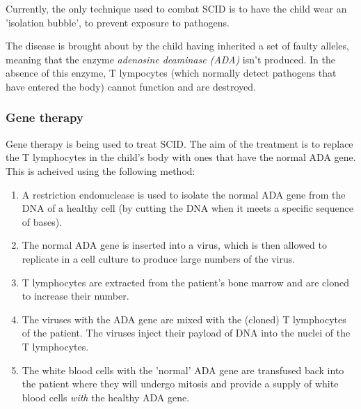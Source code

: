 \documentclass{article}
\begin{document}
Currently, the only technique used to combat SCID is to have the child wear an
'isolation bubble', to prevent exposure to pathogens.

The disease is brought about by the child having inherited a set of faulty
alleles, meaning that the enzyme {\it adenosine deaminase (ADA)} isn't produced.
In the absence of this enzyme, T lympocytes (which normally detect pathogens
that have entered the body) cannot function and are destroyed.

\subsubsection*{Gene therapy}

Gene therapy is being used to treat SCID. The aim of the treatment is to replace
the T lymphocytes in the child's body with ones that have the normal ADA gene.
This is acheived using the following method:

\begin{enumerate}

	\item A restriction endonuclease is used to isolate the normal ADA gene from
	the DNA of a healthy cell (by cutting the DNA when it meets a specific
	sequence of bases).

	\item The normal ADA gene is inserted into a virus, which is then allowed to
	replicate in a cell culture to produce large numbers of the virus.

	\item T lymphocytes are extracted from the patient's bone marrow and are
	cloned to increase their number.

	\item The viruses with the ADA gene are mixed with the (cloned) T
	lymphocytes of the patient. The viruses inject their payload of DNA into
	the nuclei of the T lymphocytes.

	\item The white blood cells with the 'normal' ADA gene are transfused back
	into the patient where they will undergo mitosis and provide a supply of
	white blood cells {\it with} the healthy ADA gene.

\end{enumerate}
\end{document}
